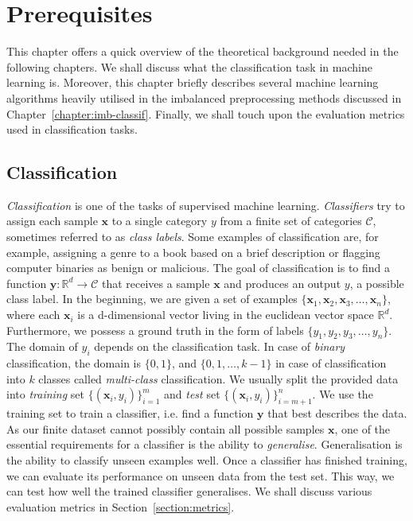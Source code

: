 \chapter{Prerequisites}
\label{chapter:prerequisites}

This chapter offers a quick overview of the theoretical background needed in the following
chapters. We shall discuss what the classification task in machine learning is. Moreover, this
chapter briefly describes several machine learning algorithms heavily utilised in the imbalanced
preprocessing methods discussed in Chapter~\ref{chapter:imb-classif}. Finally, we shall touch upon
the evaluation metrics used in classification tasks.


\section{Classification}
\label{section:classification}

\textit{Classification} is one of the tasks of supervised machine learning. \textit{Classifiers}
try to assign each sample $\mathbf{x}$ to a single category $y$ from a finite set of categories
$\mathcal{C}$, sometimes referred to as \textit{class labels}. Some examples of classification are,
for example, assigning a genre to a book based on a brief description or flagging computer binaries
as benign or malicious. The goal of classification is to find a function $\mathbf{y} \colon
\mathbb{R}^d \to \mathcal{C}$ that receives a sample $\mathbf{x}$ and produces an output $y$, a
possible class label. In the beginning, we are given a set of examples $\{\mathbf{x}_1,
\mathbf{x}_2, \mathbf{x}_3, \dots, \mathbf{x}_n\}$, where each $\mathbf{x}_i$ is a d-dimensional
vector living in the euclidean vector space $\mathbb{R}^d$. Furthermore, we possess a ground truth
in the form of labels $\{y_1, y_2, y_3, \dots, y_n\}$. The domain of $y_i$ depends on the
classification task. In case of \textit{binary} classification, the domain is $\{0, 1\}$, and $\{0,
1, \dots, k - 1\}$ in case of classification into $k$ classes called \textit{multi-class}
classification. We usually split the provided data into \textit{training} set $\{(\mathbf{x}_i,
y_i)\}_{i=1}^{m}$ and \textit{test} set $\{(\mathbf{x}_i, y_i)\}_{i=m + 1}^{n}$.  We use the
training set to train a classifier, i.e. find a function $\mathbf{y}$ that best describes the data.
As our finite dataset cannot possibly contain all possible samples $\mathbf{x}$, one of the
essential requirements for a classifier is the ability to \textit{generalise}. Generalisation is
the ability to classify unseen examples well. Once a classifier has finished training, we can
evaluate its performance on unseen data from the test set.  This way, we can test how well the
trained classifier generalises. We shall discuss various evaluation metrics in
Section~\ref{section:metrics}.
